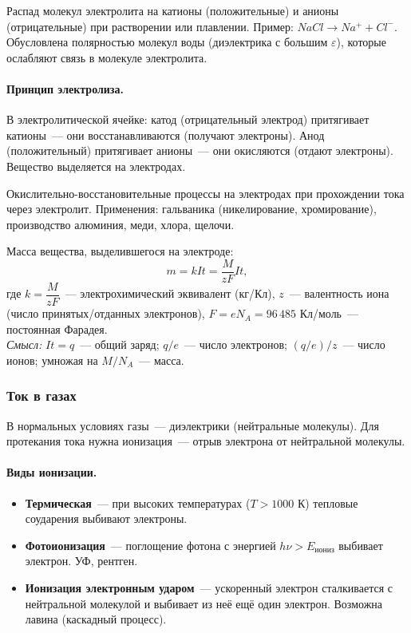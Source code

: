 \documentclass[12pt]{article}
\begin{document}
\begin{definition}
	Распад молекул электролита на катионы (положительные) и анионы (отрицательные) при растворении или плавлении. Пример: $NaCl \to Na^+ + Cl^-$. Обусловлена полярностью молекул воды (диэлектрика с большим $\varepsilon$), которые ослабляют связь в молекуле электролита.
\end{definition}

\paragraph{Принцип электролиза.}
В электролитической ячейке: катод (отрицательный электрод) притягивает катионы~--- они восстанавливаются (получают электроны). Анод (положительный) притягивает анионы~--- они окисляются (отдают электроны). Вещество выделяется на электродах.

\begin{definition}[Электролиз]
	Окислительно-восстановительные процессы на электродах при прохождении тока через электролит. Применения: гальваника (никелирование, хромирование), производство алюминия, меди, хлора, щелочи.
\end{definition}

\begin{law}
	Масса вещества, выделившегося на электроде:
	\[
		m = kIt = \frac{M}{zF} It,
	\]
	где $k = \dfrac{M}{zF}$~--- электрохимический эквивалент (кг/Кл), $z$~--- валентность иона (число принятых/отданных электронов), $F = eN_A = 96\,485$ Кл/моль~--- постоянная Фарадея.\\
	\textit{Смысл:} $It = q$~--- общий заряд; $q/e$~--- число электронов; $(q/e)/z$~--- число ионов; умножая на $M/N_A$~--- масса.
\end{law}

\subsubsection{Ток в газах}

В нормальных условиях газы~--- диэлектрики (нейтральные молекулы). Для протекания тока нужна ионизация~--- отрыв электрона от нейтральной молекулы.

\paragraph{Виды ионизации.}
\begin{itemize}
	\item \textbf{Термическая}~--- при высоких температурах ($T > 1000$ К) тепловые соударения выбивают электроны.
	\item \textbf{Фотоионизация}~--- поглощение фотона с энергией $h\nu > E_{\text{иониз}}$ выбивает электрон. УФ, рентген.
	\item \textbf{Ионизация электронным ударом}~--- ускоренный электрон сталкивается с нейтральной молекулой и выбивает из неё ещё один электрон. Возможна лавина (каскадный процесс).
\end{itemize}
\end{document}
